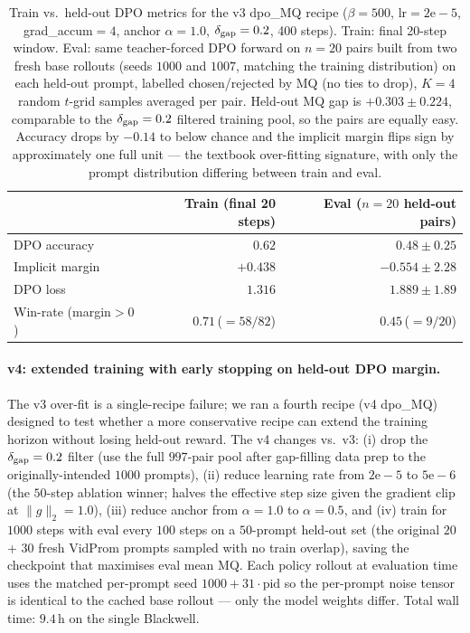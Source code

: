 \documentclass{article}
\begin{document}
\begin{table}[t]
\centering
\caption{Train vs.\ held-out DPO metrics for the v3 dpo\_MQ recipe ($\beta=500$, lr$=2\mathrm{e}{-}5$, grad\_accum$=4$, anchor $\alpha=1.0$, $\delta_{\rm gap}=0.2$, 400 steps). Train: final 20-step window. Eval: same teacher-forced DPO forward on $n=20$ pairs built from two fresh base rollouts (seeds $1000$ and $1007$, matching the training distribution) on each held-out prompt, labelled chosen/rejected by MQ (no ties to drop), $K=4$ random $t$-grid samples averaged per pair. Held-out MQ gap is $+0.303\pm0.224$, comparable to the $\delta_{\rm gap}=0.2$ filtered training pool, so the pairs are equally easy. Accuracy drops by $-0.14$ to below chance and the implicit margin flips sign by approximately one full unit --- the textbook over-fitting signature, with only the prompt distribution differing between train and eval.}
\label{tab:overfit}
\begin{tabular}{lrr}
\toprule
 & Train (final 20 steps) & Eval ($n=20$ held-out pairs) \\
\midrule
DPO accuracy        & $0.62$              & $\mathbf{0.48 \pm 0.25}$ \\
Implicit margin     & $+0.438$         & $\mathbf{-0.554 \pm 2.28}$ \\
DPO loss            & $1.316$            & $1.889 \pm 1.89$ \\
Win-rate (margin$>0$)& $0.71$\,($=58/82$) & $0.45$\,($=9/20$) \\
\bottomrule
\end{tabular}
\end{table}

\paragraph{v4: extended training with early stopping on held-out DPO margin.} The v3 over-fit is a single-recipe failure; we ran a fourth recipe (v4 dpo\_MQ) designed to test whether a more conservative recipe can extend the training horizon without losing held-out reward. The v4 changes vs.\ v3: (i) drop the $\delta_{\rm gap}=0.2$ filter (use the full $997$-pair pool after gap-filling data prep to the originally-intended $1000$ prompts), (ii) reduce learning rate from $2\mathrm{e}{-}5$ to $5\mathrm{e}{-}6$ (the $50$-step ablation winner; halves the effective step size given the gradient clip at $\|g\|_2=1.0$), (iii) reduce anchor from $\alpha=1.0$ to $\alpha=0.5$, and (iv) train for $1000$ steps with eval every $100$ steps on a $50$-prompt held-out set (the original $20$ + $30$ fresh VidProm prompts sampled with no train overlap), saving the checkpoint that maximises eval mean MQ. Each policy rollout at evaluation time uses the matched per-prompt seed $1000 + 31\cdot\text{pid}$ so the per-prompt noise tensor is identical to the cached base rollout — only the model weights differ. Total wall time: $9.4$\,h on the single Blackwell.
\end{document}
